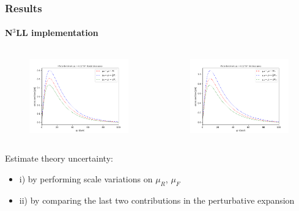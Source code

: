 \documentclass[aspectratio=43]{beamer}
\begin{document}
\begin{frame}
	
	\frametitle{Results}
	\framesubtitle{N$^{3}$LL implementation}
	
	\footnotesize
	
	\begin{columns}
		
		
		\begin{figure}
			\includegraphics[width = 6cm]{plots/part3/chapter6/hturbo_sv_a.png}
		\end{figure}
		
		
		\begin{figure}
			\includegraphics[width = 6cm]{plots/part3/chapter6/hturbo_sv_b.png}
		\end{figure}
		
	\end{columns}
	
	Estimate theory uncertainty:
	
	\vspace{0.5 cm}
	
	\begin{itemize}
		\item i) by performing scale variations on $\mu_{R}$, $\mu_{F}$
		\item ii) by comparing the last two contributions in the perturbative expansion
	\end{itemize}
	
\end{frame}
\end{document}
